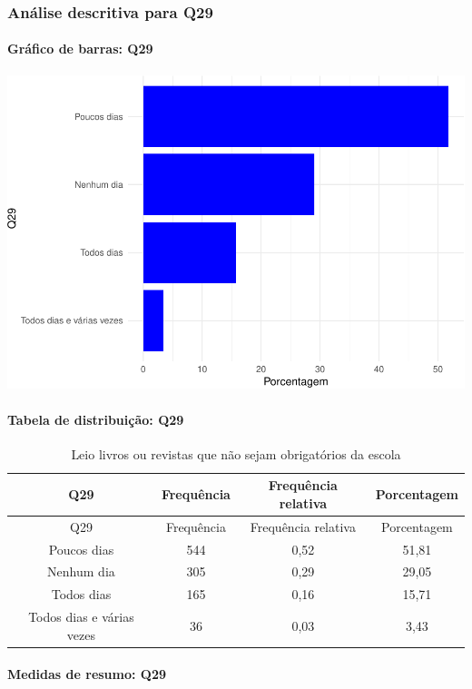 \documentclass[]{article}
\let\oldparagraph\paragraph
\renewcommand{\paragraph}[1]{\oldparagraph{#1}\mbox{}}
\begin{document}
\hypertarget{anuxe1lise-descritiva-para-q29}{%
\subsubsection{Análise descritiva para Q29}\label{anuxe1lise-descritiva-para-q29}}

\hypertarget{gruxe1fico-de-barras-q29}{%
\paragraph{Gráfico de barras: Q29}\label{gruxe1fico-de-barras-q29}}

\begin{center}\includegraphics[width=0.75\linewidth]{relatorio_covid19_files/figure-latex/unnamed-chunk-895-1} \end{center}

\hypertarget{tabela-de-distribuiuxe7uxe3o-q29}{%
\paragraph{Tabela de distribuição: Q29}\label{tabela-de-distribuiuxe7uxe3o-q29}}

\begin{longtable}[]{@{}cccc@{}}
\caption{\label{tab:unnamed-chunk-896}Leio livros ou revistas que não sejam obrigatórios da escola}\tabularnewline
\toprule
Q29 & Frequência & Frequência relativa & Porcentagem\tabularnewline
\midrule
\endfirsthead
\toprule
Q29 & Frequência & Frequência relativa & Porcentagem\tabularnewline
\midrule
\endhead
Poucos dias & 544 & 0,52 & 51,81\tabularnewline
Nenhum dia & 305 & 0,29 & 29,05\tabularnewline
Todos dias & 165 & 0,16 & 15,71\tabularnewline
Todos dias e várias vezes & 36 & 0,03 & 3,43\tabularnewline
\bottomrule
\end{longtable}

\hypertarget{medidas-de-resumo-q29}{%
\paragraph{Medidas de resumo: Q29}\label{medidas-de-resumo-q29}}
\end{document}
